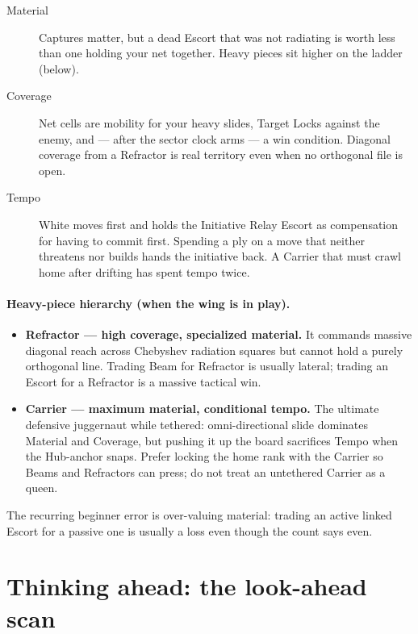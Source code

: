 \documentclass[11pt,a4paper]{article}
\begin{document}
\begin{description}
  \item[Material] Captures matter, but a dead Escort that was not radiating is
        worth less than one holding your net together. Heavy pieces sit higher
        on the ladder (below).
  \item[Coverage] Net cells are mobility for your heavy slides, Target Locks
        against the enemy, and --- after the sector clock arms --- a win
        condition. Diagonal coverage from a Refractor is real territory even
        when no orthogonal file is open.
  \item[Tempo] White moves first and holds the Initiative Relay Escort as
        compensation for having to commit first. Spending a ply on a move that
        neither threatens nor builds hands the initiative back. A Carrier that
        must crawl home after drifting has spent tempo twice.
\end{description}

\paragraph{Heavy-piece hierarchy (when the wing is in play).}
\begin{itemize}
  \item \textbf{Refractor --- high coverage, specialized material.} It commands
        massive diagonal reach across Chebyshev radiation squares but cannot
        hold a purely orthogonal line. Trading Beam for Refractor is usually
        lateral; trading an Escort for a Refractor is a massive tactical win.
  \item \textbf{Carrier --- maximum material, conditional tempo.} The ultimate
        defensive juggernaut while tethered: omni-directional slide dominates
        Material and Coverage, but pushing it up the board sacrifices Tempo
        when the Hub-anchor snaps. Prefer locking the home rank with the
        Carrier so Beams and Refractors can press; do not treat an untethered
        Carrier as a queen.
\end{itemize}

The recurring beginner error is over-valuing material: trading an active
linked Escort for a passive one is usually a loss even though the count says
even.

\section{Thinking ahead: the look-ahead scan}
\end{document}
